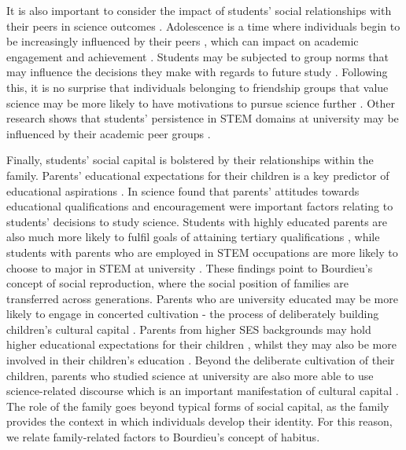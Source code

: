It is also important to consider the impact of students' social relationships with their peers in science outcomes \cite{osborne2003attitudes}. Adolescence is a time where individuals begin to be increasingly influenced by their peers \cite{douvan1966adolescent}, which can impact on academic engagement and achievement \cite{ryan2000peer}. Students may be subjected to group norms that may influence the decisions they make with regards to future study \cite{brown1986perceptions}. Following this, it is no surprise that individuals belonging to friendship groups that value science may be more likely to have motivations to pursue science further \cite{robnett2013friendship}. Other research shows that students' persistence in STEM domains at university may be influenced by their academic peer groups \cite{Ost_2010}.

Finally, students' social capital is bolstered by their relationships within the family. Parents' educational expectations for their children is a key predictor of educational aspirations \cite{wu2015early}. In science \cite{Lyons_2006} found that parents' attitudes towards educational qualifications and encouragement were important factors relating to students' decisions to study science. Students with highly educated parents are also much more likely to fulfil goals of attaining tertiary qualifications \cite{reynolds2011change}, while students with parents who are employed in STEM occupations are more likely to choose to major in STEM at university \cite{moakler2014college}. These findings point to Bourdieu's concept of social reproduction, where the social position of families are transferred across generations. Parents who are university educated may be more likely to engage in concerted cultivation - the process of deliberately building children's cultural capital \cite{lareau2011unequal}. Parents from higher SES backgrounds may hold higher educational expectations for their children \cite{carolan2015does}, whilst they may also be more involved in their children's education \cite{cheadle2011quantitative}. Beyond the deliberate cultivation of their children, parents who studied science at university are also more able to use science-related discourse which is an important manifestation of cultural capital \cite{Lyons_2006,bernstein1971class}. The role of the family goes beyond typical forms of social capital, as the family provides the context in which individuals develop their identity. For this reason, we relate family-related factors to Bourdieu's concept of habitus. 

